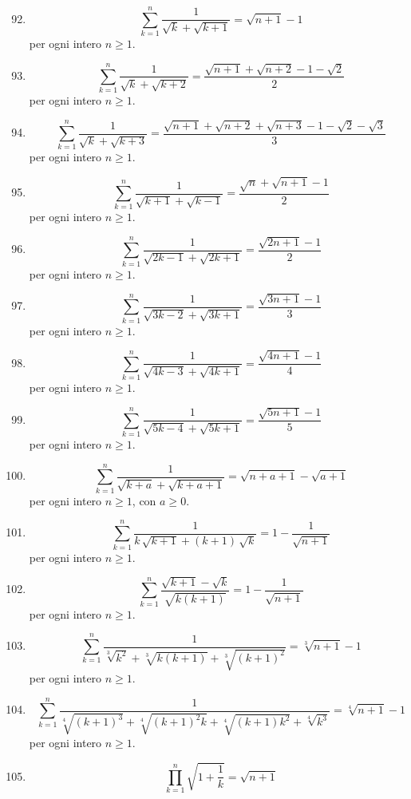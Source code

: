 \documentclass[11pt,a4paper]{article}
\begin{document}
\begin{enumerate}
\setcounter{enumi}{91}
\item \[ \sum_{k=1}^{n} \frac{1}{\sqrt{k} + \sqrt{k + 1}} = \sqrt{n + 1} - 1 \]
{\small per ogni intero $n\ge 1$.}
\item \[ \sum_{k=1}^{n} \frac{1}{\sqrt{k} + \sqrt{k + 2}} = \frac{\sqrt{n + 1} + \sqrt{n + 2} - 1 - \sqrt{2}}{2} \]
{\small per ogni intero $n\ge 1$.}
\item \[ \sum_{k=1}^{n} \frac{1}{\sqrt{k} + \sqrt{k + 3}} = \frac{\sqrt{n + 1} + \sqrt{n + 2} + \sqrt{n + 3} - 1 - \sqrt{2} - \sqrt{3}}{3} \]
{\small per ogni intero $n\ge 1$.}
\item \[ \sum_{k=1}^{n} \frac{1}{\sqrt{k + 1} + \sqrt{k - 1}} = \frac{\sqrt{n} + \sqrt{n + 1} - 1}{2} \]
{\small per ogni intero $n\ge 1$.}
\item \[ \sum_{k=1}^{n} \frac{1}{\sqrt{2k - 1} + \sqrt{2k + 1}} = \frac{\sqrt{2n + 1} - 1}{2} \]
{\small per ogni intero $n\ge 1$.}
\item \[ \sum_{k=1}^{n} \frac{1}{\sqrt{3k - 2} + \sqrt{3k + 1}} = \frac{\sqrt{3n + 1} - 1}{3} \]
{\small per ogni intero $n\ge 1$.}
\item \[ \sum_{k=1}^{n} \frac{1}{\sqrt{4k - 3} + \sqrt{4k + 1}} = \frac{\sqrt{4n + 1} - 1}{4} \]
{\small per ogni intero $n\ge 1$.}
\item \[ \sum_{k=1}^{n} \frac{1}{\sqrt{5k - 4} + \sqrt{5k + 1}} = \frac{\sqrt{5n + 1} - 1}{5} \]
{\small per ogni intero $n\ge 1$.}
\item \[ \sum_{k=1}^{n} \frac{1}{\sqrt{k + a} + \sqrt{k + a + 1}} = \sqrt{n + a + 1} - \sqrt{a + 1} \]
{\small per ogni intero $n\ge 1$, con $a\ge0$.}
\item \[ \sum_{k=1}^{n} \frac{1}{k\,\sqrt{k + 1} + \left(k + 1\right)\,\sqrt{k}} = 1 - \frac{1}{\sqrt{n + 1}} \]
{\small per ogni intero $n\ge 1$.}
\item \[ \sum_{k=1}^{n} \frac{\sqrt{k + 1} - \sqrt{k}}{\sqrt{k\left(k + 1\right)}} = 1 - \frac{1}{\sqrt{n + 1}} \]
{\small per ogni intero $n\ge 1$.}
\item \[ \sum_{k=1}^{n} \frac{1}{\sqrt[3]{k^{2}} + \sqrt[3]{k\left(k + 1\right)} + \sqrt[3]{\left(k + 1\right)^{2}}} = \sqrt[3]{n + 1} - 1 \]
{\small per ogni intero $n\ge 1$.}
\item \[ \sum_{k=1}^{n} \frac{1}{\sqrt[4]{\left(k + 1\right)^{3}} + \sqrt[4]{\left(k + 1\right)^{2}k} + \sqrt[4]{\left(k + 1\right)k^{2}} + \sqrt[4]{k^{3}}} = \sqrt[4]{n + 1} - 1 \]
{\small per ogni intero $n\ge 1$.}
\item \[ \prod_{k=1}^{n} \sqrt{1 + \frac{1}{k}} = \sqrt{n + 1} \]

\end{enumerate}
\end{document}

